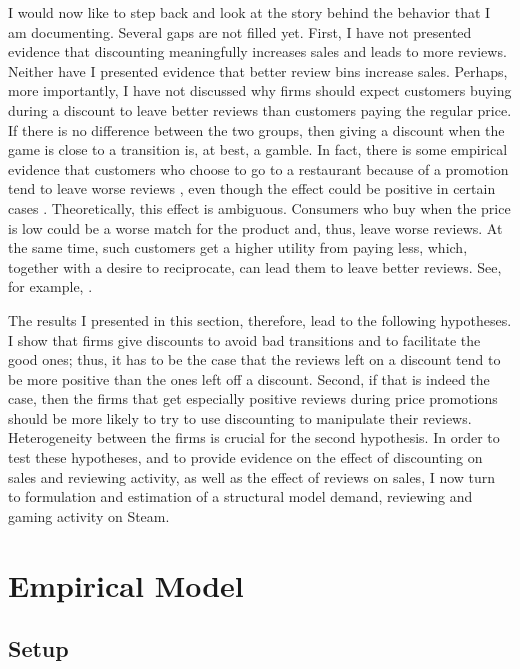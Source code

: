 \documentclass[
  12pt,
  pagebackref]{article}
\begin{document}
I would now like to step back and look at the story behind the behavior
that I am documenting. Several gaps are not filled yet. First, I have
not presented evidence that discounting meaningfully increases sales and
leads to more reviews. Neither have I presented evidence that better
review bins increase sales. Perhaps, more importantly, I have not
discussed why firms should expect customers buying during a discount to
leave better reviews than customers paying the regular price. If there
is no difference between the two groups, then giving a discount when the
game is close to a transition is, at best, a gamble. In fact, there is
some empirical evidence that customers who choose to go to a restaurant
because of a promotion tend to leave worse reviews
\citep{ByersEtAl12, Li16}, even though the effect could be positive in
certain cases \citep{Li16, ZhuEtAl19}. Theoretically, this effect is
ambiguous. Consumers who buy when the price is low could be a worse
match for the product and, thus, leave worse reviews. At the same time,
such customers get a higher utility from paying less, which, together
with a desire to reciprocate, can lead them to leave better reviews.
See, for example, \citet{AcemogluEtAl19}.

The results I presented in this section, therefore, lead to the
following hypotheses. I show that firms give discounts to avoid bad
transitions and to facilitate the good ones; thus, it has to be the case
that the reviews left on a discount tend to be more positive than the
ones left off a discount. Second, if that is indeed the case, then the
firms that get especially positive reviews during price promotions
should be more likely to try to use discounting to manipulate their
reviews. Heterogeneity between the firms is crucial for the second
hypothesis. In order to test these hypotheses, and to provide evidence
on the effect of discounting on sales and reviewing activity, as well as
the effect of reviews on sales, I now turn to formulation and estimation
of a structural model demand, reviewing and gaming activity on Steam.

\hypertarget{empirical-model}{%
\section{Empirical Model}\label{empirical-model}}

\hypertarget{setup}{%
\subsection{Setup}\label{setup}}
\end{document}

